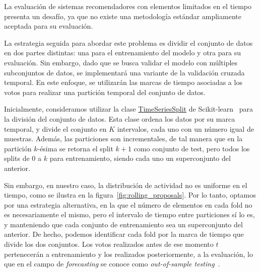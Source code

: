 La evaluación de sistemas recomendadores con elementos limitados en el tiempo presenta un desafío, ya que no existe una metodología estándar ampliamente aceptada para su evaluación.

La estrategia seguida para abordar este problema es dividir el conjunto de datos en dos partes distintas: una para el entrenamiento del modelo y otra para su evaluación. Sin embargo, dado que se busca validar el modelo con múltiples subconjuntos de datos, se implementará una variante de la validación cruzada temporal. En este enfoque, se utilizarán las marcas de tiempo asociadas a los votos para realizar una partición temporal del conjunto de datos.

Inicialmente, consideramos utilizar la clase \url{TimeSeriesSplit} de Scikit-learn~\cite{pedregosa_scikit-learn_2011} para la división del conjunto de datos. Esta clase ordena los datos por su marca temporal, y divide el conjunto en $K$ intervalos, cada uno con un número igual de muestras. Además, las particiones son incrementales, de tal manera que en la partición $k$-ésima se retorna el split $k+1$ como conjunto de test, pero todos los splits de 0 a $k$ para entrenamiento, siendo cada uno un superconjunto del anterior.

Sin embargo, en nuestro caso, la distribución de actividad no es uniforme en el tiempo, como se ilustra en la figura~\ref{fig:rolling_proposals}. Por lo tanto, optamos por una estrategia alternativa, en la que el número de elementos en cada fold no es necesariamente el mismo, pero el intervalo de tiempo entre particiones sí lo es, y manteniendo que cada conjunto de entrenamiento sea un superconjunto del anterior. De hecho, podemos identificar cada fold por la marca de tiempo que divide los dos conjuntos. Los votos realizados antes de ese momento $t$ pertenecerán a entrenamiento y los realizados posteriormente, a la evaluación, lo que en el campo de \textit{forecasting} se conoce como \textit{out-of-sample testing}~\cite{tashman_out--sample_2000}.

